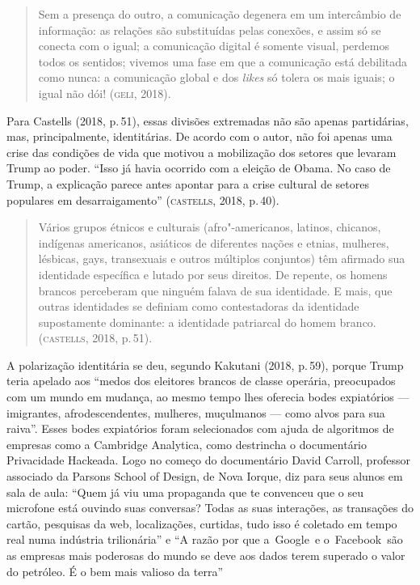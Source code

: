 \begin{quote}
Sem a presença do outro, a comunicação degenera em um intercâmbio de
informação: as relações são substituídas pelas conexões, e assim só se
conecta com o igual; a comunicação digital é somente visual, perdemos
todos os sentidos; vivemos uma fase em que a comunicação está debilitada
como nunca: a comunicação global e dos \textit{likes} só tolera os mais
iguais; o igual não dói! (\textsc{geli}, 2018).
\end{quote}

Para Castells (2018, p.\,51), essas divisões extremadas não são apenas
partidárias, mas, principalmente, identitárias. De acordo com o autor,
não foi apenas uma crise das condições de vida que motivou a mobilização
dos setores que levaram Trump ao poder. ``Isso já havia ocorrido com a
eleição de Obama. No caso de Trump, a explicação parece antes apontar
para a crise cultural de setores populares em desarraigamento''
(\textsc{castells}, 2018, p.\,40).

\begin{quote}
Vários grupos étnicos e culturais (afro"-americanos, latinos, chicanos,
indígenas americanos, asiáticos de diferentes nações e etnias, mulheres,
lésbicas, gays, transexuais e outros múltiplos conjuntos) têm afirmado
sua identidade específica e lutado por seus direitos. De repente, os
homens brancos perceberam que ninguém falava de sua identidade. E mais,
que outras identidades se definiam como contestadoras da identidade
supostamente dominante: a identidade patriarcal do homem branco.
(\textsc{castells}, 2018, p.\,51).
\end{quote}


A polarização identitária se deu, segundo Kakutani (2018, p.\,59), porque
Trump teria apelado aos ``medos dos eleitores brancos de classe
operária, preocupados com um mundo em mudança, ao mesmo tempo lhes
oferecia bodes expiatórios --- imigrantes, afrodescendentes, mulheres,
muçulmanos --- como alvos para sua raiva''. Esses bodes expiatórios foram
selecionados com ajuda de algoritmos de empresas como a Cambridge
Analytica, como destrincha o documentário Privacidade Hackeada. Logo no
começo do documentário David Carroll, professor associado da Parsons
School of Design, de Nova Iorque, diz para seus alunos em sala
de aula: ``Quem já viu uma propaganda que te convenceu que o seu
microfone está ouvindo suas conversas? Todas as suas interações, as
transações do cartão, pesquisas da web, localizações, curtidas, tudo
isso é coletado em tempo real numa indústria trilionária'' e ``A razão por
que a~Google~e o~Facebook~são as empresas mais poderosas do mundo se
deve aos dados terem superado o valor do petróleo. É o bem mais valioso
da terra''

